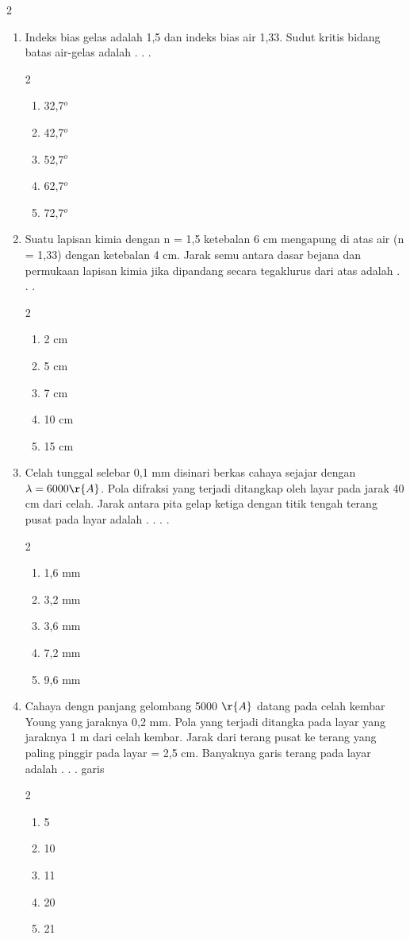 \documentclass[11pt,a4paper]{extarticle}
\newcommand{\pilgani}[1]{                            \vspace{-0.3cm}\begin{multicols}{2}
 \begin{enumerate}[label=\Alph*., itemsep=0pt,topsep=0pt,leftmargin=*,align=Center]#1                     \end{enumerate}
 \phantom{ini cuma sapi, wedus, dan ayam}
 \end{multicols}}
\begin{document}
\begin{multicols*}{2}
\begin{enumerate}
\vspace{3cm}
\item Indeks bias gelas adalah 1,5 dan indeks bias air 1,33. Sudut kritis bidang batas air-gelas adalah . . .
\pilgani{
        \item 32,7$^o$
        \item 42,7$^o$
        \item 52,7$^o$
        \item 62,7$^o$
        \item 72,7$^o$
        }
\vspace{3cm}
\item Suatu lapisan kimia dengan n = 1,5 ketebalan 6 cm mengapung di atas air (n = 1,33) dengan ketebalan 4 cm. Jarak semu antara dasar bejana dan permukaan lapisan kimia jika dipandang secara tegaklurus dari atas adalah  . . . 
\pilgani{
        \item 2 cm
        \item 5 cm
        \item 7 cm
        \item 10 cm
        \item 15 cm
        }
\vspace{3cm}
\item Celah tunggal selebar 0,1 mm disinari berkas cahaya sejajar dengan $\lambda = 6000 \r{A}$. Pola difraksi yang terjadi ditangkap oleh layar pada jarak 40 cm dari celah. Jarak antara pita gelap ketiga dengan titik tengah terang pusat pada layar adalah . . . .
\pilgani{
        \item 1,6 mm
        \item 3,2 mm
        \item 3,6 mm
        \item 7,2 mm
        \item 9,6 mm
        }

\vspace{3cm}
\item Cahaya dengn panjang gelombang 5000 $\r{A}$ datang pada celah kembar Young yang jaraknya 0,2 mm. Pola yang terjadi ditangka pada layar yang jaraknya 1 m dari celah kembar. Jarak dari terang pusat ke terang yang paling pinggir pada layar = 2,5 cm. Banyaknya garis terang pada layar adalah . . . garis
\pilgani{
        \item 5
        \item 10
        \item 11
        \item 20
        \item 21
        }


\end{enumerate}
\end{multicols*}
\end{document}
